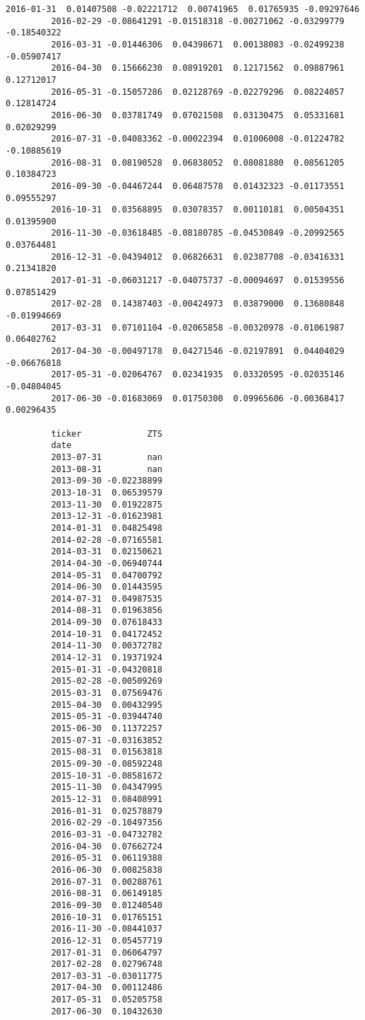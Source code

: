 \documentclass[11pt]{article}
\begin{document}
\begin{Verbatim}[commandchars=\\\{\}]
         2016-01-31  0.01407508 -0.02221712  0.00741965  0.01765935 -0.09297646   
         2016-02-29 -0.08641291 -0.01518318 -0.00271062 -0.03299779 -0.18540322   
         2016-03-31 -0.01446306  0.04398671  0.00138083 -0.02499238 -0.05907417   
         2016-04-30  0.15666230  0.08919201  0.12171562  0.09887961  0.12712017   
         2016-05-31 -0.15057286  0.02128769 -0.02279296  0.08224057  0.12814724   
         2016-06-30  0.03781749  0.07021508  0.03130475  0.05331681  0.02029299   
         2016-07-31 -0.04083362 -0.00022394  0.01006008 -0.01224782 -0.10885619   
         2016-08-31  0.08190528  0.06838052  0.08081880  0.08561205  0.10384723   
         2016-09-30 -0.04467244  0.06487578  0.01432323 -0.01173551  0.09555297   
         2016-10-31  0.03568895  0.03078357  0.00110181  0.00504351  0.01395900   
         2016-11-30 -0.03618485 -0.08180785 -0.04530849 -0.20992565  0.03764481   
         2016-12-31 -0.04394012  0.06826631  0.02387708 -0.03416331  0.21341820   
         2017-01-31 -0.06031217 -0.04075737 -0.00094697  0.01539556  0.07851429   
         2017-02-28  0.14387403 -0.00424973  0.03879000  0.13680848 -0.01994669   
         2017-03-31  0.07101104 -0.02065858 -0.00320978 -0.01061987  0.06402762   
         2017-04-30 -0.00497178  0.04271546 -0.02197891  0.04404029 -0.06676818   
         2017-05-31 -0.02064767  0.02341935  0.03320595 -0.02035146 -0.04804045   
         2017-06-30 -0.01683069  0.01750300  0.09965606 -0.00368417  0.00296435   
         
         ticker             ZTS  
         date                    
         2013-07-31         nan  
         2013-08-31         nan  
         2013-09-30 -0.02238899  
         2013-10-31  0.06539579  
         2013-11-30  0.01922875  
         2013-12-31 -0.01623981  
         2014-01-31  0.04825498  
         2014-02-28 -0.07165581  
         2014-03-31  0.02150621  
         2014-04-30 -0.06940744  
         2014-05-31  0.04700792  
         2014-06-30  0.01443595  
         2014-07-31  0.04987535  
         2014-08-31  0.01963856  
         2014-09-30  0.07618433  
         2014-10-31  0.04172452  
         2014-11-30  0.00372782  
         2014-12-31  0.19371924  
         2015-01-31 -0.04320818  
         2015-02-28 -0.00509269  
         2015-03-31  0.07569476  
         2015-04-30  0.00432995  
         2015-05-31 -0.03944740  
         2015-06-30  0.11372257  
         2015-07-31 -0.03163852  
         2015-08-31  0.01563818  
         2015-09-30 -0.08592248  
         2015-10-31 -0.08581672  
         2015-11-30  0.04347995  
         2015-12-31  0.08408991  
         2016-01-31  0.02578879  
         2016-02-29 -0.10497356  
         2016-03-31 -0.04732782  
         2016-04-30  0.07662724  
         2016-05-31  0.06119388  
         2016-06-30  0.00825838  
         2016-07-31  0.00288761  
         2016-08-31  0.06149185  
         2016-09-30  0.01240540  
         2016-10-31  0.01765151  
         2016-11-30 -0.08441037  
         2016-12-31  0.05457719  
         2017-01-31  0.06064797  
         2017-02-28  0.02796748  
         2017-03-31 -0.03011775  
         2017-04-30  0.00112486  
         2017-05-31  0.05205758  
         2017-06-30  0.10432630  
         

\end{Verbatim}
\end{document}
